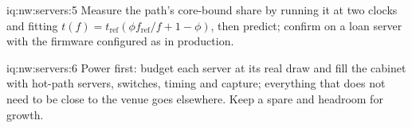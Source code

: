 \begin{solution}{iq:nw:servers:5}
Measure the path's core-bound share by running it at two clocks and fitting $t(f) = t_{\mathrm{ref}}(\phi f_{\mathrm{ref}}/f + 1 - \phi)$, then
predict; confirm on a loan server with the firmware configured as in production.
\end{solution}

\begin{solution}{iq:nw:servers:6}
Power first: budget each server at its real draw and fill the cabinet with hot-path servers, switches, timing and capture; everything that does
not need to be close to the venue goes elsewhere. Keep a spare and headroom for growth.
\end{solution}
